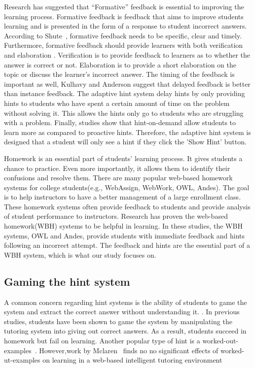 \documentclass{sigchi}
\begin{document}
Research has suggested that ``Formative'' feedback is essential to improving the learning process\cite{Azevedo1995}\cite{Bangert-Drowns1991}. Formative feedback is feedback that aims to improve students learning and is presented in the form of a response to student incorrect answers\cite{Shute2008}. According to Shute~\cite{Shute2008}, formative feedback needs to be specific, clear and timely. Furthermore, formative feedback should provide learners with both verification and elaboration \cite{Mason2001} \cite{Bangert-Drowns1991}. Verification is to provide feedback to learners as to whether the answer is correct or not. Elaboration is to provide a short elaboration on the topic or discuss the learner's incorrect answer. The timing of the feedback is important as well, Kulhavy and Anderson suggest that delayed feedback is better than instance feedback\cite{Kulhavy1972}. The adaptive hint system delay hints by only providing hints to students who have spent a certain amount of time on the problem without solving it. This allows the hints only go to students who are struggling with a problem. Finally, studies show that hint-on-demand allow students to learn more as compared to proactive hints\cite{Razzaq2010}. Therefore, the adaptive hint system is designed that a student will only see a hint if they click the 'Show Hint' button.

Homework is an essential part of students' learning
process\cite{Cooper2006}. It gives students a chance to practice. Even more importantly, it allows them to identify their confusions and resolve them. There are many popular web-based homework systems for college students(e.g., WebAssign, WebWork, OWL, Andes). The goal is to help instructors to have a better management of a large enrollment class. These homework systems often provide feedback to students and provide analysis of student performance to instructors. Research has proven the web-based homework(WBH) systems to be helpful in
learning\cite{MestHartRath2002}\cite{Vanlehn2005}. In these studies, the WBH systems, OWL and Andes, provide students with immediate feedback and hints following an incorrect
attempt\cite{MestHartRath2002}\cite{Vanlehn2005}. The feedback and hints are the essential part of a WBH system, which is what our study focuses on.

\subsection*{Gaming the hint system}

A common concern regarding hint systems is the ability of students to
game the system and extract the correct answer without understanding
it.  \cite{Baker2004}\cite{Baker2005}. In previous studies, students
have been shown to game the system by manipulating the tutoring system
into giving out correct answers\cite{Baker2004Off-task}. As a result,
students succeed in homework but fail on learning. Another popular
type of hint is a worked-out-examples~\cite{Atkinson2000}.
However,work by Mclaren~\cite{McLaren2006} finds no no significant
effects of worked-ut-examples on learning in a web-based intelligent
tutoring environment
\end{document}
